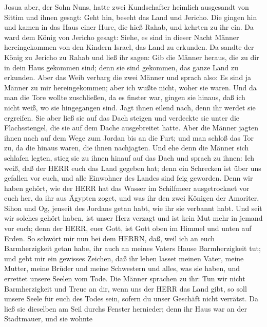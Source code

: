  Josua aber, der Sohn Nuns, hatte zwei Kundschafter heimlich
ausgesandt von Sittim und ihnen gesagt: Geht hin, beseht das Land und
Jericho. Die gingen hin und kamen in das Haus einer Hure, die hieß
Rahab, und kehrten zu ihr ein.  Da ward dem König von
Jericho gesagt: Siehe, es sind in dieser Nacht Männer hereingekommen von
den Kindern Israel, das Land zu erkunden.  Da sandte der
König zu Jericho zu Rahab und ließ ihr sagen: Gib die Männer heraus, die
zu dir in dein Haus gekommen sind; denn sie sind gekommen, das ganze
Land zu erkunden.  Aber das Weib verbarg die zwei Männer und
sprach also: Es sind ja Männer zu mir hereingekommen; aber ich wußte
nicht, woher sie waren.  Und da man die Tore wollte
zuschließen, da es finster war, gingen sie hinaus, daß ich nicht weiß,
wo sie hingegangen sind. Jagt ihnen eilend nach, denn ihr werdet sie
ergreifen.  Sie aber ließ sie auf das Dach steigen und
verdeckte sie unter die Flachsstengel, die sie auf dem Dache
ausgebreitet hatte.  Aber die Männer jagten ihnen nach auf
dem Wege zum Jordan bis an die Furt; und man schloß das Tor zu, da die
hinaus waren, die ihnen nachjagten.  Und ehe denn die Männer
sich schlafen legten, stieg sie zu ihnen hinauf auf das Dach
 und sprach zu ihnen: Ich weiß, daß der HERR euch das Land
gegeben hat; denn ein Schrecken ist über uns gefallen vor euch, und alle
Einwohner des Landes sind feig geworden.  Denn wir haben
gehört, wie der HERR hat das Wasser im Schilfmeer ausgetrocknet vor euch
her, da ihr aus Ägypten zoget, und was ihr den zwei Königen der
Amoriter, Sihon und Og, jenseit des Jordans getan habt, wie ihr sie
verbannt habt.  Und seit wir solches gehört haben, ist
unser Herz verzagt und ist kein Mut mehr in jemand vor euch; denn der
HERR, euer Gott, ist Gott oben im Himmel und unten auf Erden.
 So schwört mir nun bei dem HERRN, daß, weil ich an euch
Barmherzigkeit getan habe, ihr auch an meines Vaters Hause
Barmherzigkeit tut; und gebt mir ein gewisses Zeichen,  daß
ihr leben lasset meinen Vater, meine Mutter, meine Brüder und meine
Schwestern und alles, was sie haben, und errettet unsere Seelen vom
Tode.  Die Männer sprachen zu ihr: Tun wir nicht
Barmherzigkeit und Treue an dir, wenn uns der HERR das Land gibt, so
soll unsere Seele für euch des Todes sein, sofern du unser Geschäft
nicht verrätst.  Da ließ sie dieselben am Seil durchs
Fenster hernieder; denn ihr Haus war an der Stadtmauer, und sie wohnte
